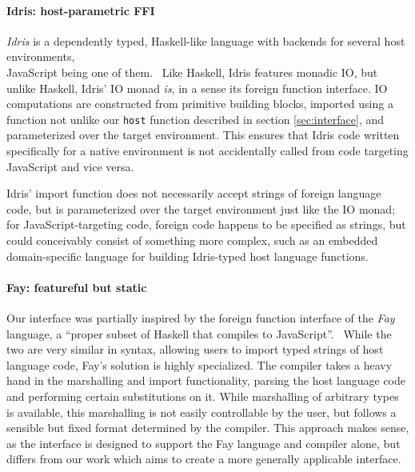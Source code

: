 \documentclass{sigplanconf}
\begin{document}
\paragraph{Idris: host-parametric FFI}
\emph{Idris} is a dependently typed, Haskell-like language with backends for
several host environments,\\
JavaScript being one of them.\ \cite{idris}
Like Haskell, Idris features monadic IO, but unlike Haskell, Idris' IO monad
\emph{is}, in a sense its foreign function interface.
IO computations are constructed from primitive building blocks, imported using
a function not unlike our \lstinline!host! function described in section
\ref{sec:interface}, and parameterized over the target environment.
This ensures that Idris code written specifically for a native environment
is not accidentally called from code targeting JavaScript and vice versa.

Idris' import function does not necessarily accept strings of foreign
language code, but is parameterized over the target environment just like the
IO monad; for JavaScript-targeting code, foreign code happens to be specified
as strings, but could conceivably consist of something more complex, such as
an embedded domain-specific language for building Idris-typed host language
functions.

\paragraph{Fay: featureful but static}
Our interface was partially inspired by the foreign function interface of the
\emph{Fay} language,
a ``proper subset of Haskell that compiles to JavaScript''.\ \cite{fay}
While the two are very similar in syntax, allowing users to import typed
strings of host language code, Fay's solution is highly specialized.
The compiler takes a heavy hand in the marshalling and import functionality,
parsing the host language code and performing certain substitutions on it.
While marshalling of arbitrary types is available, this marshalling is not
easily controllable by the user, but follows a sensible but fixed format
determined by the compiler.
This approach makes sense, as the interface is designed to support the Fay
language and compiler alone, but differs from our work which aims to create
a more generally applicable interface.
\end{document}
